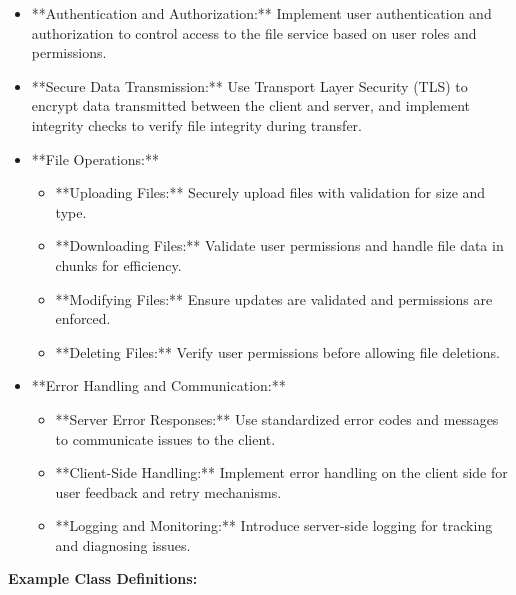 \documentclass[12pt]{article}
\begin{document}
\begin{itemize}
    \item **Authentication and Authorization:** Implement user authentication and authorization to control access to the file service based on user roles and permissions.
    \item **Secure Data Transmission:** Use Transport Layer Security (TLS) to encrypt data transmitted between the client and server, and implement integrity checks to verify file integrity during transfer.
    \item **File Operations:**
    \begin{itemize}
        \item **Uploading Files:** Securely upload files with validation for size and type.
        \item **Downloading Files:** Validate user permissions and handle file data in chunks for efficiency.
        \item **Modifying Files:** Ensure updates are validated and permissions are enforced.
        \item **Deleting Files:** Verify user permissions before allowing file deletions.
    \end{itemize}
    \item **Error Handling and Communication:** 
    \begin{itemize}
        \item **Server Error Responses:** Use standardized error codes and messages to communicate issues to the client.
        \item **Client-Side Handling:** Implement error handling on the client side for user feedback and retry mechanisms.
        \item **Logging and Monitoring:** Introduce server-side logging for tracking and diagnosing issues.
    \end{itemize}
\end{itemize}

\textbf{Example Class Definitions:}
\end{document}
